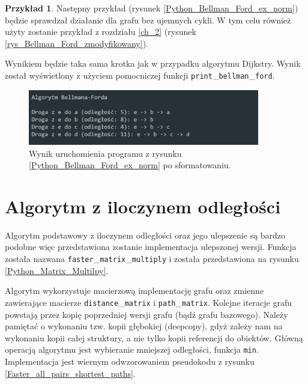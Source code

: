 \documentclass[12pt,a4paper]{book}
\theoremstyle{definition}
\newtheorem{ex}{Przykład}
\numberwithin{equation}{chapter}
\begin{document}
\begin{ex}
Następny przykład (rysunek \ref{Python_Bellman_Ford_ex_norm}) będzie sprawdzał działanie dla grafu bez ujemnych cykli. W tym celu również użyty zostanie przykład z rozdziału \ref{ch_2} (rysunek \ref{rys_Bellman_Ford_zmodyfikowany}).



Wynikiem będzie taka sama krotka jak w przypadku algorytmu Dijkstry. Wynik został wyświetlony z użyciem pomocniczej funkcji \texttt{print}\_\texttt{bellman}\_\texttt{ford}.

\begin{figure}[!htp]
\centering
\includegraphics[width=0.9\textwidth]{images/bellman_ford_example.pdf}
\caption{Wynik uruchomienia programu z rysunku \ref{Python_Bellman_Ford_ex_norm} po sformatowaniu.}
\label{rys_wynik_bellman_ford_sformatowany}
\end{figure}

\end{ex}

\section{Algorytm z iloczynem odległości}

Algorytm podstawowy z iloczynem odległości oraz jego ulepszenie są bardzo podobne więc przedstawiona zostanie implementacja ulepszonej wersji. Funkcja została nazwana \texttt{faster}\_\texttt{matrix}\_\texttt{multiply} i została przedstawiona na rysunku \ref{Python_Matrix_Multilpy}.



Algorytm wykorzystuje macierzową implementację grafu oraz zmienne zawierające macierze \texttt{distance}\_\texttt{matrix} i \texttt{path}\_\texttt{matrix}. Kolejne iteracje grafu powstają przez kopię poprzedniej wersji grafu (bądź grafu bazowego). Należy pamiętać o wykonaniu tzw. kopii głębokiej (deepcopy), gdyż zależy nam na wykonaniu kopii całej struktury, a nie tylko kopii referencji do obiektów. Główną operacją algorytmu jest wybieranie mniejszej odległości, funkcja \texttt{min}. Implementacja jest wiernym odwzorowaniem pseudokodu z rysunku \ref{Faster_all_pairs_shortest_paths}.
\end{document}
